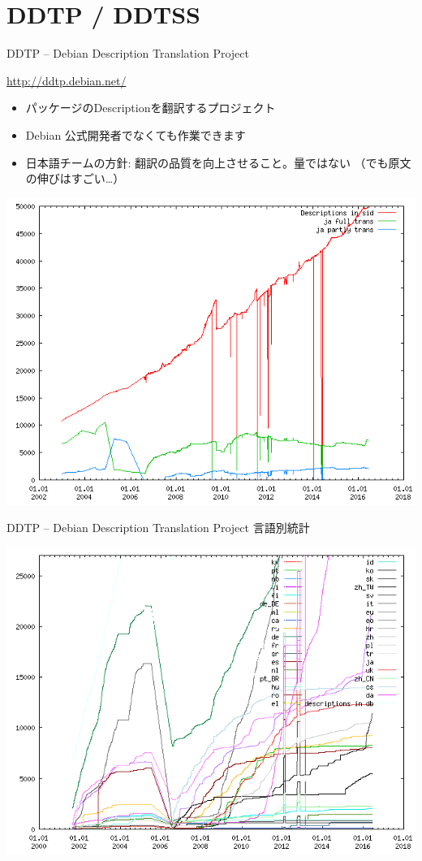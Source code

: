 \section{DDTP / DDTSS}
 \begin{frame}{DDTP -- Debian Description Translation Project}

 \url{http://ddtp.debian.net/}

  \begin{itemize}
   \item パッケージのDescriptionを翻訳するプロジェクト
   \item Debian 公式開発者でなくても作業できます
   \item 日本語チームの方針: 翻訳の品質を向上させること。量ではない
     {\scriptsize （でも原文の伸びはすごい…）}
  \end{itemize}

  \begin{center} 
  \includegraphics[width=0.65\hsize]{image201606/stat-trans-sid-ja.png}
  \end{center}

 \end{frame}

 \begin{frame}{DDTP -- Debian Description Translation Project}
   言語別統計

   \begin{center} 
  \includegraphics[width=0.9\hsize]{image201606/ddts-stat.png}
   \end{center}
 \end{frame}

